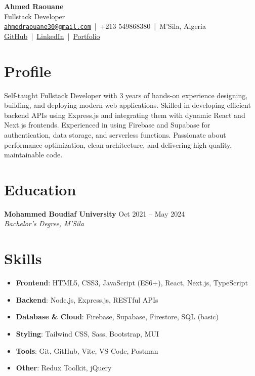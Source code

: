 \documentclass[a4paper,12pt]{article}
\begin{document}
\pagestyle{empty}

\begin{center}
    {\LARGE \textbf{Ahmed Raouane}}\\
    {\large Fullstack Developer}\\[0.5em]
    \href{mailto:ahmedraouane30@gmail.com}{\texttt{ahmedraouane30@gmail.com}} \,|\, +213 549868380 \,|\, M’Sila, Algeria\\
    \href{https://github.com/ahmedRAOUANE}{GitHub} \,|\, 
    \href{https://linkedin.com/in/ahmed-raouane}{LinkedIn} \,|\, 
    \href{https://portfolio-ahmedraouanes-projects.vercel.app/}{Portfolio}
\end{center}

\section*{Profile}
\noindent Self-taught Fullstack Developer with 3 years of hands-on experience designing, building, and deploying modern web applications. Skilled in developing efficient backend APIs using Express.js and integrating them with dynamic React and Next.js frontends. Experienced in using Firebase and Supabase for authentication, data storage, and serverless functions. Passionate about performance optimization, clean architecture, and delivering high-quality, maintainable code.

\section*{Education}
\textbf{Mohammed Boudiaf University} \hfill Oct 2021 -- May 2024\\
\textit{Bachelor’s Degree, M’Sila}

\section*{Skills}
\begin{itemize}[noitemsep]
    \item \textbf{Frontend}: HTML5, CSS3, JavaScript (ES6+), React, Next.js, TypeScript
    \item \textbf{Backend}: Node.js, Express.js, RESTful APIs
    \item \textbf{Database \& Cloud}: Firebase, Supabase, Firestore, SQL (basic)
    \item \textbf{Styling}: Tailwind CSS, Sass, Bootstrap, MUI
    \item \textbf{Tools}: Git, GitHub, Vite, VS Code, Postman
    \item \textbf{Other}: Redux Toolkit, jQuery
\end{itemize}
\end{document}
